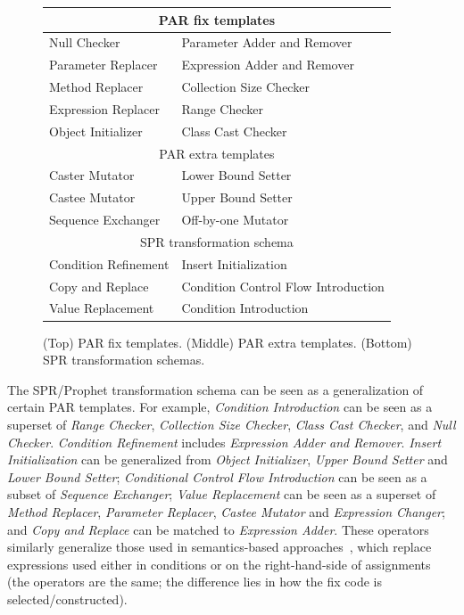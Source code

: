 \documentclass[conference]{IEEEtran}
\begin{document}
\begin{figure}[ht]
  \centering
{\small
\begin{tabular}{ll}
\toprule
\multicolumn{2}{c}{PAR fix templates} \\
\midrule
Null Checker & Parameter Adder and Remover \\ 
Parameter Replacer & Expression Adder and Remover \\  
Method Replacer & Collection Size Checker \\
Expression Replacer &  Range Checker\\
Object Initializer & Class Cast Checker\\
\midrule
\multicolumn{2}{c}{PAR extra templates} \\
\midrule
Caster Mutator & Lower Bound Setter  \\
Castee Mutator & Upper Bound Setter  \\
Sequence Exchanger & Off-by-one Mutator\\
\midrule
\multicolumn{2}{c}{SPR transformation schema} \\
\midrule
Condition Refinement & Insert Initialization \\
Copy and Replace & Condition Control Flow Introduction  \\
Value Replacement  & Condition Introduction \\
\bottomrule
\end{tabular}
  \caption{(Top) PAR fix templates. (Middle) PAR extra templates. (Bottom) SPR transformation schemas.   \label{approachTemplates}}
}

\end{figure}

The SPR/Prophet transformation schema can be seen as a generalization of certain PAR 
templates. For example, \emph{Condition Introduction} can be seen as a superset of 
\emph{Range Checker}, \emph{Collection Size 
Checker}, \emph{Class Cast Checker}, and \emph{Null Checker}. \emph{Condition Refinement} includes \emph{Expression Adder and Remover}. \emph{Insert Initialization} can be 
generalized from \emph{Object Initializer}, \emph{Upper Bound Setter} and \emph{Lower Bound Setter}; \emph{Conditional Control Flow Introduction} can be 
seen as a subset of \emph{Sequence Exchanger};
\emph{Value Replacement} can be seen as a superset of \emph{Method 
Replacer}, \emph{Parameter Replacer}, \emph{Castee Mutator} and \emph{Expression Changer}; and \emph{Copy 
and Replace} can be matched to \emph{Expression Adder}. 
These operators similarly generalize those used in semantics-based approaches~\cite{examples},
which replace expressions used either in conditions or on the right-hand-side of
assignments (the operators are the same; the difference lies in how the fix code
is selected/constructed). 
\end{document}
